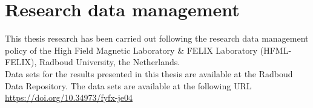 \chapter{Research data management}

This thesis research has been carried out following the research data management policy of the High Field Magnetic Laboratory \& FELIX Laboratory (HFML-FELIX), Radboud University, the Netherlands.\\

Data sets for the results presented in this thesis are available at the Radboud Data Repository. The data sets are available at the following URL \url{https://doi.org/10.34973/fyfx-je04}
